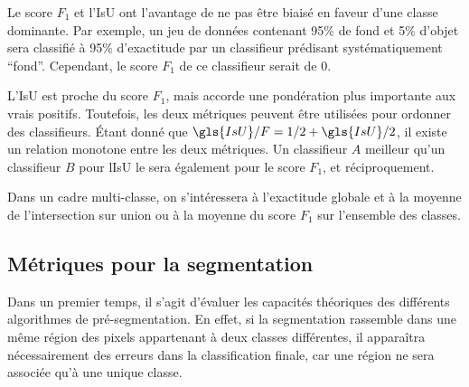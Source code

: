Le score $F_1$ et l'\gls{IsU} ont l'avantage de ne pas être biaisé en faveur d'une classe dominante. Par exemple, un jeu de données contenant 95\% de fond et 5\% d'objet sera classifié à 95\% d'exactitude par un classifieur prédisant systématiquement ``fond''. Cependant, le score $F_1$ de ce classifieur serait de $0$.

L'\gls{IsU} est proche du score $F_1$, mais accorde une pondération plus importante aux vrais positifs. Toutefois, les deux métriques peuvent être utilisées pour ordonner des classifieurs. Étant donné que $\gls{IsU}/F = 1/2 + \gls{IsU}/2$, il existe un relation monotone entre les deux métriques. Un classifieur $A$ meilleur qu'un classifieur $B$ pour l\gls{IsU} le sera également pour le score $F_1$, et réciproquement.

Dans un cadre multi-classe, on s'intéressera à l'exactitude globale et à la moyenne de l'intersection sur union ou à la moyenne du score $F_1$ sur l'ensemble des classes.

\subsection{Métriques pour la segmentation}

Dans un premier temps, il s'agit d'évaluer les capacités théoriques des différents algorithmes de pré-segmentation. En effet, si la segmentation rassemble dans une même région des pixels appartenant à deux classes différentes, il apparaîtra nécessairement des erreurs dans la classification finale, car une région ne sera associée qu'à une unique classe.

